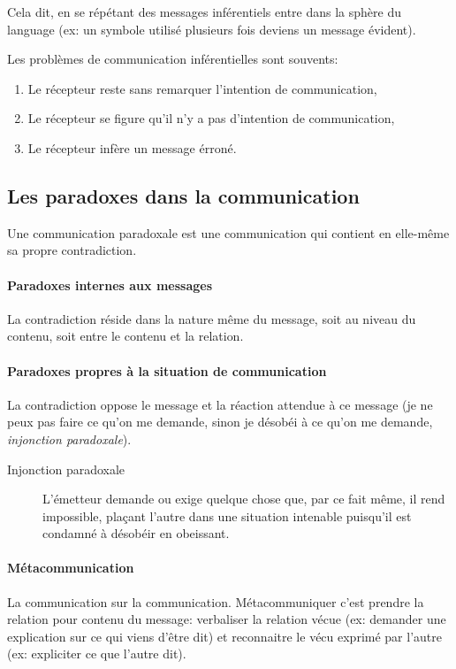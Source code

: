 \documentclass[11pt]{article} %
\begin{document}
	Cela dit, en se répétant des messages inférentiels entre dans la sphère du language (ex: un symbole utilisé plusieurs fois deviens un message évident).

	Les problèmes de communication inférentielles sont souvents:
	\begin{enumerate}
		\item Le récepteur reste sans remarquer l'intention de communication,
		\item Le récepteur se figure qu'il n'y a pas d'intention de communication,
		\item Le récepteur infère un message érroné.
	\end{enumerate}

	\subsection{Les paradoxes dans la communication}

	Une communication paradoxale est une communication qui contient en elle-même sa propre contradiction.

	\paragraph{Paradoxes internes aux messages} La contradiction réside dans la nature même du message, soit au niveau du contenu, soit entre le contenu et la relation.

	\paragraph{Paradoxes propres à la situation de communication} La contradiction oppose le message et la réaction attendue à ce message (je ne peux pas faire ce qu'on me demande, sinon je désobéi à ce qu'on me demande, \textit{injonction paradoxale}).

	\begin{description}
		\item[Injonction paradoxale] L'émetteur demande ou exige quelque chose que, par ce fait même, il rend impossible, plaçant l'autre dans une situation intenable puisqu'il est condamné à désobéir en obeissant.
 	\end{description}

	\paragraph{Métacommunication} La communication sur la communication. Métacommuniquer c'est prendre la relation pour contenu du message: verbaliser la relation vécue (ex: demander une explication sur ce qui viens d'être dit) et reconnaitre le vécu exprimé par l'autre (ex: expliciter ce que l'autre dit).
\end{document}
